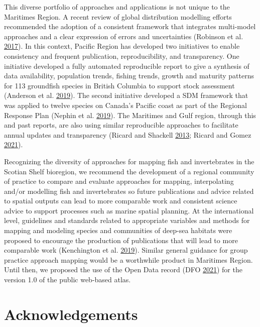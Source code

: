 \documentclass[12pt]{article}\usepackage[]{graphicx}\usepackage[]{color}
\begin{document}
This diverse portfolio of approaches and applications is not unique to the Maritimes Region. A recent review of global distribution modelling efforts recommended the adoption of a consistent framework that integrates multi-model approaches and a clear expression of errors and uncertainties (Robinson et al. \protect\hyperlink{ref-Robinson:2017}{2017}). In this context, Pacific Region has developed two initiatives to enable consistency and frequent publication, reproducibility, and transparency. One initiative developed a fully automated reproducible report to give a synthesis of data availability, population trends, fishing trends, growth and maturity patterns for 113 groundfish species in British Columbia to support stock assessment (Anderson et al. \protect\hyperlink{ref-Anderson:2019}{2019}). The second initiative developed a SDM framework that was applied to twelve species on Canada's Pacific coast as part of the Regional Response Plan (Nephin et al. \protect\hyperlink{ref-Nephin:2019}{2019}). The Maritimes and Gulf region, through this and past reports, are also using similar reproducible approaches to facilitate annual updates and transparency (Ricard and Shackell \protect\hyperlink{ref-Ricard:MARatlas:2013}{2013}; Ricard and Gomez \protect\hyperlink{ref-Ricard-Gomez-2021}{2021}).

Recognizing the diversity of approaches for mapping fish and invertebrates in the Scotian Shelf bioregion, we recommend the development of a regional community of practice to compare and evaluate approaches for mapping, interpolating and/or modelling fish and invertebrates so future publications and advice related to spatial outputs can lead to more comparable work and consistent science advice to support processes such as marine spatial planning. At the international level, guidelines and standards related to appropriate variables and methods for mapping and modeling species and communities of deep-sea habitats were proposed to encourage the production of publications that will lead to more comparable work (Kenchington et al. \protect\hyperlink{ref-Kenchington2019}{2019}). Similar general guidance for group practice approach mapping would be a worthwhile product in Maritimes Region. Until then, we proposed the use of the Open Data record (DFO \protect\hyperlink{ref-OpenData_MAR_RV}{2021}) for the version 1.0 of the public web-based atlas.

\hypertarget{acknowledgements}{%
\section{Acknowledgements}\label{acknowledgements}}
\end{document}
